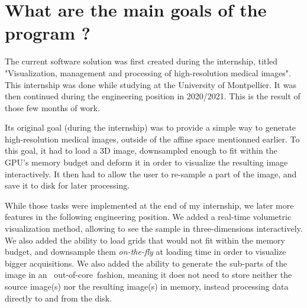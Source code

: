 \section{What are the main goals of the program ?}\label{text:01_intro:01_goals}
{

	The current software solution was first created during the internship, titled "Visualization, management and processing of high-resolution medical images". This internship was done while studying at the University of Montpellier. It was then continued during the engineering position in 2020/2021. This is the result of those few months of work.

	\vspace{\baselineskip}

	Its original goal (during the internship) was to provide a simple way to generate high-resolution medical images, outside of the affine space mentionned earlier. To this goal, it had to load a 3D image, downsampled enough to fit within the GPU's memory budget and deform it in order to visualize the resulting image interactively. It then had to allow the user to re-sample a part of the image, and save it to disk for later processing.

	\vspace{\baselineskip}


	While those tasks were implemented at the end of my internship, we later more features in the following engineering position. We added a real-time volumetric visualization method, allowing to see the sample in three-dimensions interactively. We also added the ability to load grids that would not fit within the memory budget, and downsample them \textit{on-the-fly} at loading time in order to visualize bigger acquisitions. We also added the ability to generate the sub-parts of the image in an \guillemotleft~out-of-core~\guillemotright fashion, meaning it does not need to store neither the source image(s) nor the resulting image(s) in memory, instead processing data directly to and from the disk.
}

